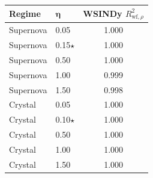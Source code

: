 \begin{tabular}{llc}
\toprule
\textbf{Regime} & $\boldsymbol{\eta}$ & \textbf{WSINDy} $R^2_{\mathrm{wf},\rho}$ \\
\midrule
Supernova & 0.05 & 1.000 \\
Supernova & 0.15$\star$ & 1.000 \\
Supernova & 0.50 & 1.000 \\
Supernova & 1.00 & 0.999 \\
Supernova & 1.50 & 0.998 \\
\midrule
Crystal & 0.05 & 1.000 \\
Crystal & 0.10$\star$ & 1.000 \\
Crystal & 0.50 & 1.000 \\
Crystal & 1.00 & 1.000 \\
Crystal & 1.50 & 1.000 \\
\bottomrule
\end{tabular}
